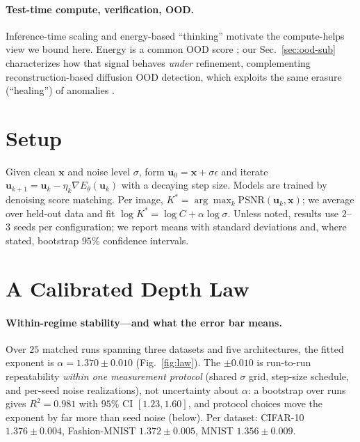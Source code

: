 \documentclass[letterpaper]{article}
\begin{document}
\paragraph{Test-time compute, verification, OOD.} Inference-time scaling \citep{snell2024} and energy-based
``thinking'' \citep{gladstone2025} motivate the compute-helps view we bound here. Energy is a common OOD
score \citep{liu2020,grathwohl2020}; our Sec.~\ref{sec:ood-sub} characterizes how that signal behaves
\emph{under} refinement, complementing reconstruction-based diffusion OOD detection, which exploits the same erasure
(``healing'') of anomalies \citep{graham2023}.

\section{Setup}
Given clean $\mathbf{x}$ and noise level $\sigma$, form $\mathbf{u}_0=\mathbf{x}+\sigma\epsilon$ and iterate
$\mathbf{u}_{k+1}=\mathbf{u}_k-\eta_k\nabla E_\theta(\mathbf{u}_k)$ with a decaying step size. Models are
trained by denoising score matching. Per image, $K^{*}=\arg\max_k\mathrm{PSNR}(\mathbf{u}_k,\mathbf{x})$; we
average over held-out data and fit $\log K^{*}=\log C+\alpha\log\sigma$. Unless noted, results use
$2$--$3$ seeds per configuration; we report means with standard deviations and, where stated, bootstrap
$95\%$ confidence intervals.

\section{A Calibrated Depth Law}
\label{sec:law}
\paragraph{Within-regime stability---and what the error bar means.} Over $25$ matched runs spanning three
datasets and five architectures, the fitted exponent is $\alpha=1.370\pm0.010$ (Fig.~\ref{fig:law}). The
$\pm0.010$ is run-to-run repeatability \emph{within one measurement protocol} (shared $\sigma$ grid,
step-size schedule, and per-seed noise realizations), not uncertainty about $\alpha$: a bootstrap over
runs gives $R^2=0.981$ with $95\%$ CI $[1.23,1.60]$, and protocol choices move the exponent by far more
than seed noise (below). Per dataset: CIFAR-10 $1.376\pm0.004$, Fashion-MNIST $1.372\pm0.005$, MNIST
$1.356\pm0.009$.
\end{document}
